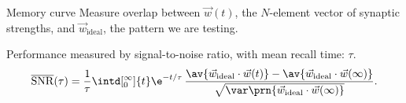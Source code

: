 \documentclass[final,hyperref={pdfpagelabels=false,bookmarks=false}]{beamer}
\DeclareMathOperator{\SNR}{SNR}
\DeclareMathOperator{\snr}{SNR}
\newcommand{\snrb}{\overline{\snr}}
\newcommand{\SNRb}{\snrb}
\newcommand{\pot}{^\text{pot}}
\newcommand{\dep}{^\text{dep}}
\newcommand{\I}{\mathbf{I}}
\newcommand{\eq}{\mathbf{p}^\infty}
\newcommand{\w}{\mathbf{w}}
\newcommand{\W}{\vec{w}}
\newcommand{\M}{\mathbf{M}}
\begin{document}
\begin{frame}{}
\begin{columns}[t]
\begin{column}{0.33\linewidth}
\begin{block}{Memory curve}
 \vp Measure overlap between $\W(t)$, the $N$-element vector of synaptic strengths, and $\W_\text{ideal}$, the pattern we are testing.

 \vp Performance measured by signal-to-noise ratio, with mean recall time: $\tau$.
 \begin{equation*}
   \begin{aligned}
     \SNRb(\tau) = \frac{1}{\tau}\intd[_0^\infty]{t}\e^{-t/\tau}\, \frac{\av{\W_\text{ideal} \cdot \W(t)} -  \av{\W_\text{ideal} \cdot \W(\infty)} }{ \sqrt{\var\prn{\W_\text{ideal} \cdot \W(\infty)}} }.
   \end{aligned}
 \end{equation*}
%
\end{block}


\end{column}
\end{columns}
\end{frame}
\end{document}
